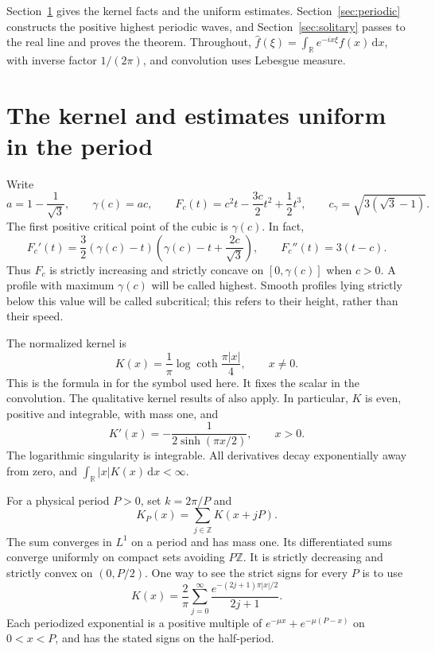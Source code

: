 \documentclass[11pt,a4paper]{article}
\theoremstyle{remark}
\newcommand{\R}{\mathbb R}
\newcommand{\cg}{c_\gamma}
\newcommand{\dd}{\,\mathrm d}
\begin{document}
Section~\ref{sec:estimates} gives the kernel facts and the uniform
estimates. Section~\ref{sec:periodic} constructs the positive highest
periodic waves, and Section~\ref{sec:solitary} passes to the real line and
proves the theorem. Throughout,
$\widehat f(\xi)=\int_\R e^{-ix\xi}f(x)\dd x$, with inverse factor
$1/(2\pi)$, and convolution uses Lebesgue measure.

\section{The kernel and estimates uniform in the period}\label{sec:estimates}

Write
\begin{equation}\label{eq:constants}
 a=1-\frac1{\sqrt3},\qquad \gamma(c)=ac,\qquad
 F_c(t)=c^2t-\frac{3c}{2}t^2+\frac12t^3,
 \qquad \cg=\sqrt{3(\sqrt3-1)}.
\end{equation}
The first positive critical point of the cubic is $\gamma(c)$. In fact,
\begin{equation}\label{eq:cubic-derivatives}
 F_c'(t)=\frac32(\gamma(c)-t)
       \left(\gamma(c)-t+\frac{2c}{\sqrt3}\right),\qquad
 F_c''(t)=3(t-c).
\end{equation}
Thus $F_c$ is strictly increasing and strictly concave on
$[0,\gamma(c)]$ when $c>0$. A profile with maximum $\gamma(c)$ will be
called highest. Smooth profiles lying strictly below this value will be
called subcritical; this refers to their height, rather than their speed.

The normalized kernel is
\begin{equation}\label{eq:kernel}
 K(x)=\frac1\pi\log\coth\frac{\pi|x|}{4},\qquad x\ne0.
\end{equation}
This is the formula in \cite[Section 4.2]{EMV} for the symbol used here.
It fixes the scalar in the convolution. The qualitative kernel results of
\cite[Lemma 2.2]{EJC} also apply. In particular, $K$ is even, positive and
integrable, with mass one, and
\begin{equation}\label{eq:kernel-derivative}
 K'(x)=-\frac1{2\sinh(\pi x/2)},\qquad x>0.
\end{equation}
The logarithmic singularity is integrable. All derivatives decay
exponentially away from zero, and
$\int_\R |x|K(x)\dd x<\infty$.

For a physical period $P>0$, set $k=2\pi/P$ and
\begin{equation}\label{eq:periodic-kernel}
 K_P(x)=\sum_{j\in\mathbb Z}K(x+jP).
\end{equation}
The sum converges in $L^1$ on a period and has mass one. Its differentiated
sums converge uniformly on compact sets avoiding $P\mathbb Z$. It is
strictly decreasing and strictly convex on $(0,P/2)$. One way to see the
strict signs for every $P$ is to use
\[
 K(x)=\frac2\pi\sum_{j=0}^\infty
       \frac{e^{-(2j+1)\pi|x|/2}}{2j+1}.
\]
Each periodized exponential is a positive multiple of
$e^{-\mu x}+e^{-\mu(P-x)}$ on $0<x<P$, and has the stated signs on the
half-period.
\end{document}

